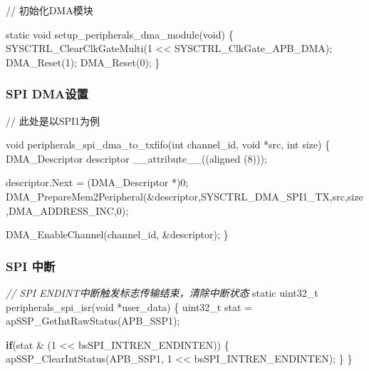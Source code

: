 \documentclass[
  12pt,
]{book}
\newenvironment{Shaded}{\begin{snugshade}}{\end{snugshade}}
\newcommand{\CommentTok}[1]{\textcolor[rgb]{0.56,0.35,0.01}{\textit{#1}}}
\newcommand{\ControlFlowTok}[1]{\textcolor[rgb]{0.13,0.29,0.53}{\textbf{#1}}}
\newcommand{\DataTypeTok}[1]{\textcolor[rgb]{0.13,0.29,0.53}{#1}}
\newcommand{\DecValTok}[1]{\textcolor[rgb]{0.00,0.00,0.81}{#1}}
\newcommand{\NormalTok}[1]{#1}
\begin{document}
// 初始化DMA模块

\begin{Shaded}
\begin{Highlighting}[]
\DataTypeTok{static} \DataTypeTok{void}\NormalTok{ setup_peripherals_dma_module(}\DataTypeTok{void}\NormalTok{)}
\NormalTok{\{}
\NormalTok{    SYSCTRL_ClearClkGateMulti(}\DecValTok{1}\NormalTok{ << SYSCTRL_ClkGate_APB_DMA);}
\NormalTok{    DMA_Reset(}\DecValTok{1}\NormalTok{);}
\NormalTok{    DMA_Reset(}\DecValTok{0}\NormalTok{);}
\NormalTok{\}}
\end{Highlighting}
\end{Shaded}

\hypertarget{spi-dmaux8bbeux7f6e}{%
\subsubsection{SPI DMA设置}\label{spi-dmaux8bbeux7f6e}}

// 此处是以SPI1为例

\begin{Shaded}
\begin{Highlighting}[]
\DataTypeTok{void}\NormalTok{ peripherals_spi_dma_to_txfifo(}\DataTypeTok{int}\NormalTok{ channel_id, }\DataTypeTok{void}\NormalTok{ *src, }\DataTypeTok{int}\NormalTok{ size)}
\NormalTok{\{}
\NormalTok{    DMA_Descriptor descriptor __attribute__((aligned (}\DecValTok{8}\NormalTok{)));}

\NormalTok{    descriptor.Next = (DMA_Descriptor *)}\DecValTok{0}\NormalTok{;}
\NormalTok{    DMA_PrepareMem2Peripheral(&descriptor,SYSCTRL_DMA_SPI1_TX,src,size,DMA_ADDRESS_INC,}\DecValTok{0}\NormalTok{);}

\NormalTok{    DMA_EnableChannel(channel_id, &descriptor);}
\NormalTok{\}}
\end{Highlighting}
\end{Shaded}

\hypertarget{spi-ux4e2dux65ad-1}{%
\subsubsection{SPI 中断}\label{spi-ux4e2dux65ad-1}}

\begin{Shaded}
\begin{Highlighting}[]
\CommentTok{// SPI ENDINT中断触发标志传输结束，清除中断状态}
\DataTypeTok{static} \DataTypeTok{uint32_t}\NormalTok{ peripherals_spi_isr(}\DataTypeTok{void}\NormalTok{ *user_data)}
\NormalTok{\{}
  \DataTypeTok{uint32_t}\NormalTok{ stat = apSSP_GetIntRawStatus(APB_SSP1);}
  
  \ControlFlowTok{if}\NormalTok{(stat & (}\DecValTok{1}\NormalTok{ << bsSPI_INTREN_ENDINTEN))}
\NormalTok{  \{}
\NormalTok{    apSSP_ClearIntStatus(APB_SSP1, }\DecValTok{1}\NormalTok{ << bsSPI_INTREN_ENDINTEN);}
\NormalTok{  \}  }
\NormalTok{\}}
\end{Highlighting}
\end{Shaded}
\end{document}
